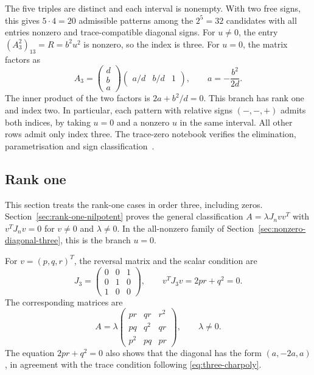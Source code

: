 \documentclass[11pt,a4paper]{article}
\begin{document}
The five triples are distinct and each interval is nonempty. With two
free signs, this gives $5\cdot4=20$ admissible patterns among the
$2^5=32$ candidates with all entries nonzero and trace-compatible
diagonal signs. For $u\ne0$, the entry $(A_3^2)_{13}=R=b^2u^2$ is
nonzero, so the index is three. For $u=0$, the matrix factors as
\[
 A_3=\begin{pmatrix}d\\ b\\ a\end{pmatrix}
       \begin{pmatrix}a/d&b/d&1\end{pmatrix},
 \qquad a=-\frac{b^2}{2d}.
\]
The inner product of the two factors is $2a+b^2/d=0$. This branch
has rank one and index two. In particular, each pattern with relative
signs $(-,-,+)$ admits both indices, by taking $u=0$ and a nonzero
$u$ in the same interval. All other rows admit only index three.
The trace-zero notebook verifies the elimination, parametrisation
and sign classification~\cite{trace-zero-notebook}.

\subsection{Rank one}
\label{sec:rank-one-three}

This section treats the rank-one cases in order three, including zeros.
Section~\ref{sec:rank-one-nilpotent} proves the general classification
$A=\lambda J_n vv^T$ with $v^TJ_n v=0$ for $v\ne0$ and $\lambda\ne0$.
In the all-nonzero family of Section~\ref{sec:nonzero-diagonal-three},
this is the branch $u=0$.

For $v=(p,q,r)^T$, the reversal matrix and the scalar condition are
\[
 J_3=\begin{pmatrix}0&0&1\\0&1&0\\1&0&0\end{pmatrix},
 \qquad v^TJ_3v=2pr+q^2=0.
\]
The corresponding matrices are
\begin{equation}\label{eq:rank-one-three-by-three}
 A=\lambda
 \begin{pmatrix}
  pr&qr&r^2\\
  pq&q^2&qr\\
  p^2&pq&pr
 \end{pmatrix},\qquad \lambda\neq0.
\end{equation}
The equation $2pr+q^2=0$ also shows that the diagonal has the form
$(a,-2a,a)$, in agreement with the trace condition following
\eqref{eq:three-charpoly}.
\end{document}
